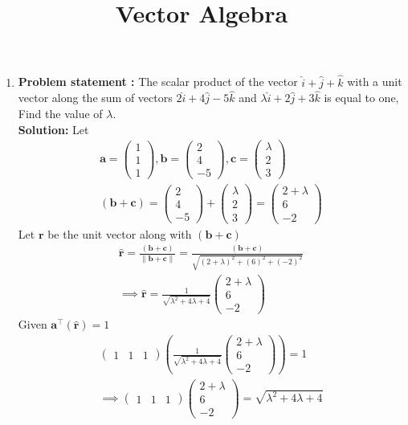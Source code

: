 \documentclass[10pt]{article}
\providecommand{\brak}[1]{\ensuremath{\left(#1\right)}}
\newcommand{\solution}{\noindent \textbf{Solution: }}
\newcommand{\myvec}[1]{\ensuremath{\begin{pmatrix}#1\end{pmatrix}}}
\providecommand{\norm}[1]{\left\lVert#1\right\rVert}
\let\vec\mathbf{}
\begin{document}
\begin{center}
\title{\textbf{Vector Algebra}}
\date{\vspace{-5ex}} %
\maketitle
\end{center}

\begin{enumerate}
\item\textbf{Problem statement :} The scalar product of the vector $\hat{i}+\hat{j}+\hat{k}$ with a unit vector along the sum of vectors $2\hat{i}+4\hat{j}-5\hat{k}$ and $\lambda\hat{i}+2\hat{j}+3\hat{k}$ is equal to one, Find the value of $\lambda$.
\\
\solution
Let
\begin{align}
\vec{a} =\myvec{1\\1\\1} , \vec{b}=\myvec{2\\4\\-5} , \vec{c}=\myvec{\lambda\\2\\3}\\
\brak{\vec{b}+\vec{c}}=\myvec{2\\4\\-5}+\myvec{\lambda\\2\\3}=\myvec{2+\lambda\\6\\-2}
\end{align}
Let $\vec{r}$ be the unit vector along with $\brak{\vec{b}+\vec{c}}$
\begin{align}
\hat{\vec{r}}=\frac{\brak{\vec{b}+\vec{c}}}{\norm{\vec{b}+\vec{c}}}=\frac{\brak{\vec{b}+\vec{c}}}{\sqrt{\brak{2+\lambda}^2+\brak{6}^2+\brak{-2}^2}}\\
\implies\hat{\vec{r}}=\frac{1}{\sqrt{\lambda^2+4\lambda+4}}\myvec{2+\lambda\\6\\-2}
\end{align}
Given $\vec{a}^\top\brak{\vec{\hat{r}}} = 1$
\begin{align}
	\myvec{1&1&1}\brak{\frac{1}{
		{\sqrt{\lambda^2+4\lambda+4}}}\myvec{2+\lambda\\6\\-2}}=1\\
\implies \myvec{1&1&1}\myvec{2+\lambda\\6\\-2}={\sqrt{\lambda^2+4\lambda+4}}\\

\end{align}
\end{enumerate}
\end{document}

